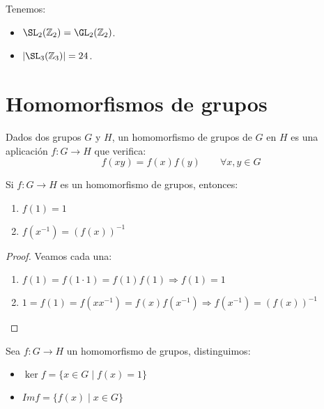 \begin{ejemplo}
    Tenemos:
    \begin{itemize}
        \item $\SL_2(\mathbb{Z}_2)=\GL_2(\mathbb{Z}_2)$.
        \item $|\SL_3(\mathbb{Z}_3)| = 24$.
    \end{itemize}
\end{ejemplo}

\section{Homomorfismos de grupos}
\begin{definicion}[Homomorfismo]
    Dados dos grupos $G$ y $H$, un homomorfismo de grupos de $G$ en $H$ es una aplicación $f:G\rightarrow H$ que verifica:
    \begin{equation*}
        f(xy) = f(x)f(y) \qquad \forall x,y\in G
    \end{equation*}
\end{definicion}

\begin{prop}
    Si $f:G\to H$ es un homomorfismo de grupos, entonces:
    \begin{enumerate}
        \item $f(1) = 1$
        \item $f(x^{-1}) = {(f(x))}^{-1}$
    \end{enumerate}
    \begin{proof}
        Veamos cada una:
        \begin{enumerate}
            \item $f(1) = f(1\cdot 1) = f(1)f(1)\Longrightarrow f(1) = 1$
            \item $1 = f(1) = f(xx^{-1}) = f(x)f(x^{-1}) \Longrightarrow f(x^{-1}) = {(f(x))}^{-1}$
        \end{enumerate}
    \end{proof}
\end{prop}

\begin{definicion}
Sea $f:G\to H$ un homomorfismo de grupos, distinguimos:
\begin{itemize}
    \item $\ker f = \{x\in G \mid f(x) = 1\}$
    \item $Im f = \{f(x) \mid x\in G\}$
\end{itemize}
\end{definicion}

